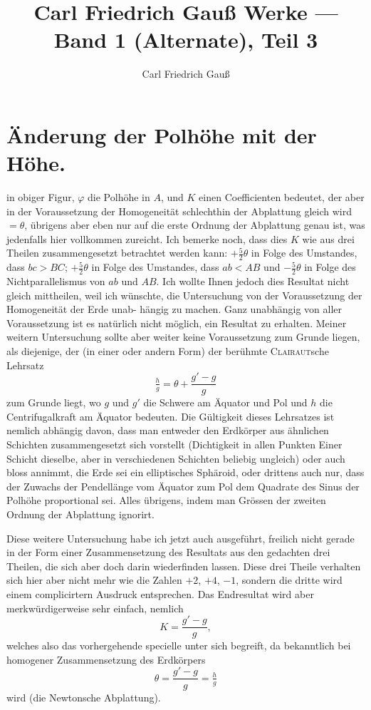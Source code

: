 \documentclass[12pt,a4paper]{article}
\title{Carl Friedrich Gau\ss{} Werke --- Band 1 (Alternate), Teil 3}
\author{Carl Friedrich Gau\ss{}}
\date{}
\theoremstyle{plain}
\theoremstyle{definition}
\theoremstyle{remark}
\begin{document}
\maketitle

\section*{Änderung der Polhöhe mit der Höhe.}

in obiger Figur, $\varphi$ die Polhöhe in $A$, und $K$ einen Coefficienten bedeutet,
der aber in der Voraussetzung der Homogeneität schlechthin der Abplattung
gleich wird $= \theta$, übrigens aber eben nur auf die erste Ordnung der Abplattung
genau ist, was jedenfalls hier vollkommen zureicht. Ich bemerke noch, dass
dies $K$ wie aus drei Theilen zusammengesetzt betrachtet werden kann: $+\frac{5}{2}\theta$
in Folge des Umstandes, dass $bc > BC$; $+\frac{5}{2}\theta$ in Folge des Umstandes, dass
$ab < AB$ und $-\frac{5}{2}\theta$ in Folge des Nichtparallelismus von $ab$ und $AB$. Ich
wollte Ihnen jedoch dies Resultat nicht gleich mittheilen, weil ich wünschte,
die Untersuchung von der Voraussetzung der Homogeneität der Erde unab-\newline
hängig zu machen. Ganz unabhängig von aller Voraussetzung ist es natürlich
nicht möglich, ein Resultat zu erhalten. Meiner weitern Untersuchung sollte
aber weiter keine Voraussetzung zum Grunde liegen, als diejenige, der (in
einer oder andern Form) der berühmte \textsc{Clairaut}sche Lehrsatz
\[
\tfrac{h}{g} = \theta + \frac{g' - g}{g}
\]
zum Grunde liegt, wo $g$ und $g'$ die Schwere am Äquator und Pol und $h$
die Centrifugalkraft am Äquator bedeuten. Die Gültigkeit dieses Lehrsatzes
ist nemlich abhängig davon, dass man entweder den Erdkörper aus ähnlichen
Schichten zusammengesetzt sich vorstellt (Dichtigkeit in allen Punkten Einer
Schicht dieselbe, aber in verschiedenen Schichten beliebig ungleich) oder auch
bloss annimmt, die Erde sei ein elliptisches Sphäroid, oder drittens auch nur,
dass der Zuwachs der Pendellänge vom Äquator zum Pol dem Quadrate des
Sinus der Polhöhe proportional sei. Alles übrigens, indem man Grössen der
zweiten Ordnung der Abplattung ignorirt.

Diese weitere Untersuchung habe ich jetzt auch ausgeführt, freilich nicht
gerade in der Form einer Zusammensetzung des Resultats aus den gedachten
drei Theilen, die sich aber doch darin wiederfinden lassen. Diese drei Theile
verhalten sich hier aber nicht mehr wie die Zahlen $+2$, $+4$, $-1$, sondern
die dritte wird einem complicirtern Ausdruck entsprechen. Das Endresultat
wird aber merkwürdigerweise sehr einfach, nemlich
\[
K = \frac{g' - g}{g},
\]
welches also das vorhergehende specielle unter sich begreift, da bekanntlich
bei homogener Zusammensetzung des Erdkörpers
\[
\theta = \frac{g' - g}{g} = \tfrac{h}{g}
\]
wird (die Newtonsche Abplattung).
\end{document}

